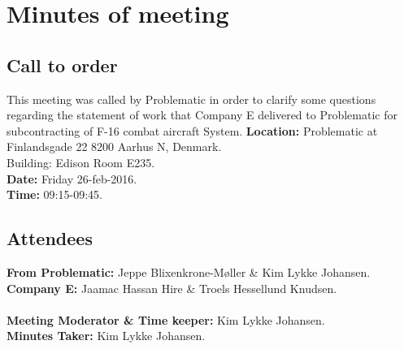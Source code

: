 %
\thispagestyle{fancy}
\chapter*{Minutes of meeting}


\section*{Call to order}
This meeting was called by Problematic in order to clarify some questions regarding the statement of work that Company E delivered to Problematic for subcontracting of F-16 combat aircraft System.
\textbf{Location:} Problematic at Finlandsgade 22 8200 Aarhus N, Denmark.\\ Building: Edison Room E235.\\
\textbf{Date:} Friday 26-feb-2016. \\
\textbf{Time:} 09:15-09:45.
\section*{Attendees}
\textbf{From Problematic:} Jeppe Blixenkrone-Møller \& Kim Lykke Johansen.\\
\textbf{Company E:} Jaamac Hassan Hire \& Troels Hessellund Knudsen.\\\\ 
\textbf{Meeting Moderator \& Time keeper:} Kim Lykke Johansen. \\
\textbf{Minutes Taker:} Kim Lykke Johansen.

